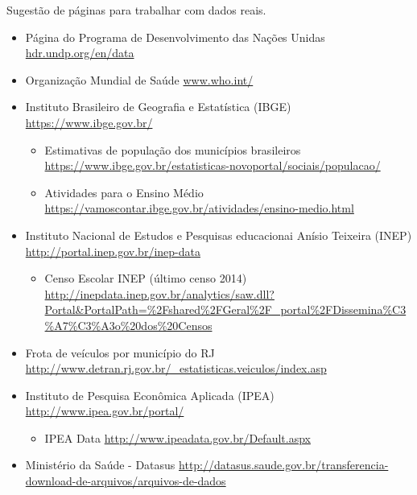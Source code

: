 Sugestão de páginas para trabalhar com dados reais.
\begin{itemize}
\item {} 
Página do Programa de Desenvolvimento das Nações Unidas \textendash{} \url{hdr.undp.org/en/data}

\item {} 
Organização Mundial de Saúde \textendash{} \url{www.who.int/}

\item {} 
Instituto Brasileiro de Geografia e Estatística (IBGE) \textendash{} \url{https://www.ibge.gov.br/}
\begin{itemize}
\item {} 
Estimativas de população dos municípios brasileiros \textendash{} \url{https://www.ibge.gov.br/estatisticas-novoportal/sociais/populacao/}

\item {} 
Atividades para o Ensino Médio \textendash{} \url{https://vamoscontar.ibge.gov.br/atividades/ensino-medio.html}

\end{itemize}

\item {} 
Instituto Nacional de Estudos e Pesquisas educacionai Anísio Teixeira (INEP) \textendash{} \url{http://portal.inep.gov.br/inep-data}

\begin{itemize}

\item {} 
Censo Escolar INEP (último censo 2014) \textendash{} \url{http://inepdata.inep.gov.br/analytics/saw.dll?Portal\&PortalPath=\%2Fshared\%2FGeral\%2F\_portal\%2FDissemina\%C3\%A7\%C3\%A3o\%20dos\%20Censos}

\end{itemize}

\item {} 
Frota de veículos por município do RJ \textendash{} \url{http://www.detran.rj.gov.br/\_estatisticas.veiculos/index.asp}

\item {} 
Instituto de Pesquisa Econômica Aplicada (IPEA) \textendash{} \url{http://www.ipea.gov.br/portal/}
\begin{itemize}
\item {} 
IPEA Data \textendash{} \url{http://www.ipeadata.gov.br/Default.aspx}

\end{itemize}

\item {} 
Ministério da Saúde - Datasus \textendash{} \url{http://datasus.saude.gov.br/transferencia-download-de-arquivos/arquivos-de-dados}

\end{itemize}


